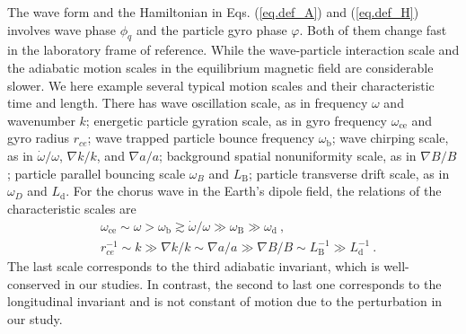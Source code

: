 The wave form and the Hamiltonian in Eqs. (\ref{eq.def_A}) and (\ref{eq.def_H}) involves wave phase $\phi_q$ and the particle gyro phase $\varphi$. Both of them change fast in the laboratory frame of reference. While the wave-particle interaction scale and the adiabatic motion scales in the equilibrium magnetic field are considerable slower. 
We here example several typical motion scales and their characteristic time and length. 
There has wave oscillation scale, as in frequency $\omega$ and wavenumber $k$;
energetic particle gyration scale, as in gyro frequency $\omega_\mathrm{ce}$ and gyro radius $r_{ce}$;
wave trapped particle bounce frequency $\omega_\mathrm{b}$; wave chirping scale, as in $\dot{\omega}/\omega$, $\nabla k/k$, and $\nabla a/a$; background spatial nonuniformity scale, as in $\nabla B/B$; particle parallel bouncing scale $\omega_B$ and $L_\mathrm{B}$; particle transverse drift scale, as in $\omega_D$ and $L_\mathrm{d}$. 
For the chorus wave in the Earth's dipole field, the relations of the characteristic scales are
\begin{equation}
    \begin{aligned}
        &\omega_\mathrm{ce} \sim \omega >  \omega_\mathrm{b} \gtrsim \dot\omega/\omega  \gg \omega_\mathrm{B} \gg \omega_\mathrm{d}~,
        \\
        &r^{-1}_{ce} \sim k \gg \nabla k/k\sim \nabla a/a \gg \nabla B/B \sim L_\mathrm{B}^{-1} \gg L_\mathrm{d}^{-1}~.
    \end{aligned}
\end{equation}
The last scale corresponds to the third adiabatic invariant, which is well-conserved in our studies. 
In contrast, the second to last one corresponds to the longitudinal invariant and is not constant of motion due to the perturbation in our study.  

